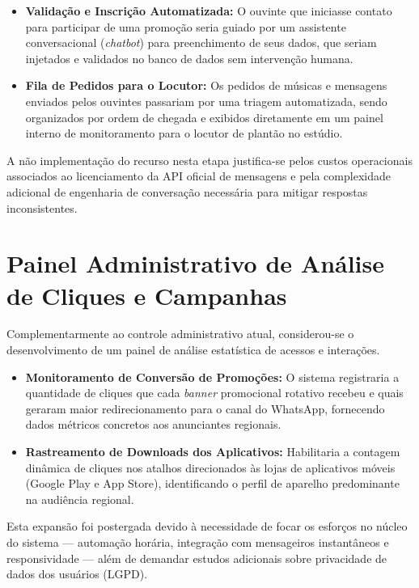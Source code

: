 \documentclass[12pt, openright, oneside, a4paper, brazil]{ads-unipac-abntex2}
\begin{document}
\begin{anexosenv}
\begin{itemize}
    \item \textbf{Validação e Inscrição Automatizada:} O ouvinte que iniciasse contato para participar de uma promoção seria guiado por um assistente conversacional (\textit{chatbot}) para preenchimento de seus dados, que seriam injetados e validados no banco de dados sem intervenção humana.
    \item \textbf{Fila de Pedidos para o Locutor:} Os pedidos de músicas e mensagens enviados pelos ouvintes passariam por uma triagem automatizada, sendo organizados por ordem de chegada e exibidos diretamente em um painel interno de monitoramento para o locutor de plantão no estúdio.
\end{itemize}

A não implementação do recurso nesta etapa justifica-se pelos custos operacionais associados ao licenciamento da API oficial de mensagens e pela complexidade adicional de engenharia de conversação necessária para mitigar respostas inconsistentes.

\section{Painel Administrativo de Análise de Cliques e Campanhas}
Complementarmente ao controle administrativo atual, considerou-se o desenvolvimento de um painel de análise estatística de acessos e interações.

\begin{itemize}
    \item \textbf{Monitoramento de Conversão de Promoções:} O sistema registraria a quantidade de cliques que cada \textit{banner} promocional rotativo recebeu e quais geraram maior redirecionamento para o canal do WhatsApp, fornecendo dados métricos concretos aos anunciantes regionais.
    \item \textbf{Rastreamento de Downloads dos Aplicativos:} Habilitaria a contagem dinâmica de cliques nos atalhos direcionados às lojas de aplicativos móveis (Google Play e App Store), identificando o perfil de aparelho predominante na audiência regional.
\end{itemize}

Esta expansão foi postergada devido à necessidade de focar os esforços no núcleo do sistema — automação horária, integração com mensageiros instantâneos e responsividade — além de demandar estudos adicionais sobre privacidade de dados dos usuários (LGPD).

\end{anexosenv}
\end{document}
